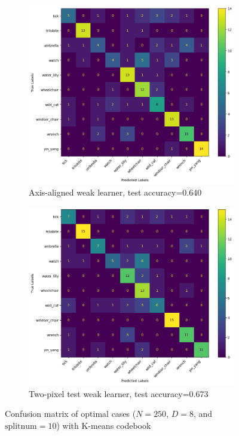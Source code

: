 \begin{figure}[htbp]
	\centering
	\begin{subfigure}[t]{0.4\linewidth}
		\centering
		\includegraphics[width=\linewidth]{image/conf-appendix/rf_axis_confusion.png}
		\caption{Axis-aligned weak learner, test accuracy=0.640}
		\label{fig:q3-appfig1}
	\end{subfigure}%
	\quad
	\begin{subfigure}[t]{0.4\linewidth}
		\centering
		\includegraphics[width=\linewidth]{image/conf-appendix/rf_two_confusion.png}
		\caption{Two-pixel test weak learner, test accuracy=0.673}
		\label{fig:q3-appfig2}
	\end{subfigure}
	\caption{Confusion matrix of optimal cases ($N=250$, $D=8$, and $\text{splitnum}=10$) with K-means codebook}
	\label{fig:APP-q3-conf}
\end{figure}

